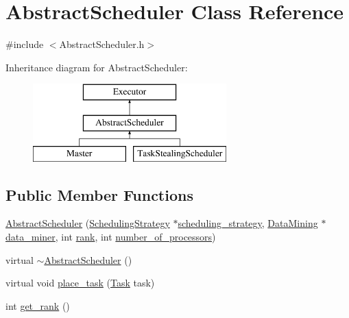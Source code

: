 \hypertarget{class_abstract_scheduler}{}\section{Abstract\+Scheduler Class Reference}
\label{class_abstract_scheduler}


{\ttfamily \#include $<$Abstract\+Scheduler.\+h$>$}

Inheritance diagram for Abstract\+Scheduler\+:\begin{figure}[H]
\begin{center}
\leavevmode
\includegraphics[height=3.000000cm]{class_abstract_scheduler}
\end{center}
\end{figure}
\subsection*{Public Member Functions}
\begin{DoxyCompactItemize}
\item 
\hyperlink{class_abstract_scheduler_addaf6f185aefd7304df9a3cc4e020b00}{Abstract\+Scheduler} (\hyperlink{class_scheduling_strategy}{Scheduling\+Strategy} $\ast$\hyperlink{class_abstract_scheduler_a7dd11eee79bfb44c820d6c28480fd0c7}{scheduling\+\_\+strategy}, \hyperlink{class_data_mining}{Data\+Mining} $\ast$\hyperlink{class_abstract_scheduler_a6e281d90fa4b965779cd13eabf7d0249}{data\+\_\+miner}, int \hyperlink{class_executor_a33c24e2887b4d9c4ef7f3566d3bc803e}{rank}, int \hyperlink{class_executor_a4e798bde66d26fe200de7e8d2b54e915}{number\+\_\+of\+\_\+processors})
\item 
virtual \hyperlink{class_abstract_scheduler_a1f8fb108f61bf092407c6fba1afb8578}{$\sim$\+Abstract\+Scheduler} ()
\item 
virtual void \hyperlink{class_abstract_scheduler_a5171d8f76ad183ea1d0f6bb393293be8}{place\+\_\+task} (\hyperlink{_types_8h_a0c77930ab3818a1680c59353f627fba8}{Task} task)
\item 
int \hyperlink{class_abstract_scheduler_a205d6e6fd08ffbc000a79944f9f59853}{get\+\_\+rank} ()
\end{DoxyCompactItemize}
